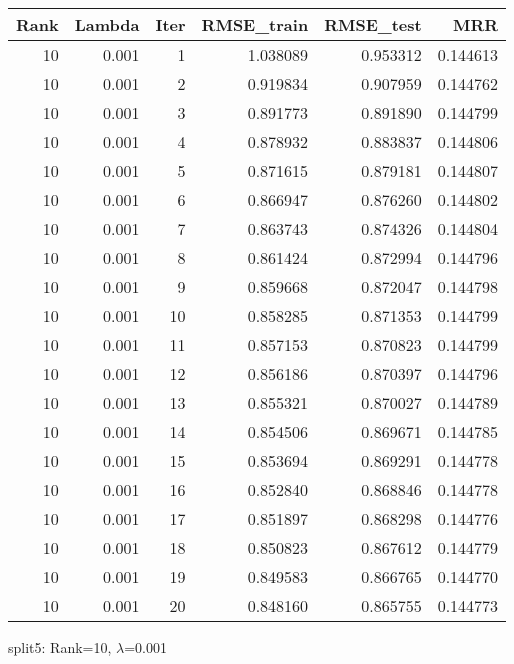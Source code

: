 \begin{tabular}{rrrrrr}
\toprule
 Rank &  Lambda &  Iter &  RMSE\_train &  RMSE\_test &       MRR \\
\midrule
   10 &   0.001 &     1 &    1.038089 &   0.953312 &  0.144613 \\
   10 &   0.001 &     2 &    0.919834 &   0.907959 &  0.144762 \\
   10 &   0.001 &     3 &    0.891773 &   0.891890 &  0.144799 \\
   10 &   0.001 &     4 &    0.878932 &   0.883837 &  0.144806 \\
   10 &   0.001 &     5 &    0.871615 &   0.879181 &  0.144807 \\
   10 &   0.001 &     6 &    0.866947 &   0.876260 &  0.144802 \\
   10 &   0.001 &     7 &    0.863743 &   0.874326 &  0.144804 \\
   10 &   0.001 &     8 &    0.861424 &   0.872994 &  0.144796 \\
   10 &   0.001 &     9 &    0.859668 &   0.872047 &  0.144798 \\
   10 &   0.001 &    10 &    0.858285 &   0.871353 &  0.144799 \\
   10 &   0.001 &    11 &    0.857153 &   0.870823 &  0.144799 \\
   10 &   0.001 &    12 &    0.856186 &   0.870397 &  0.144796 \\
   10 &   0.001 &    13 &    0.855321 &   0.870027 &  0.144789 \\
   10 &   0.001 &    14 &    0.854506 &   0.869671 &  0.144785 \\
   10 &   0.001 &    15 &    0.853694 &   0.869291 &  0.144778 \\
   10 &   0.001 &    16 &    0.852840 &   0.868846 &  0.144778 \\
   10 &   0.001 &    17 &    0.851897 &   0.868298 &  0.144776 \\
   10 &   0.001 &    18 &    0.850823 &   0.867612 &  0.144779 \\
   10 &   0.001 &    19 &    0.849583 &   0.866765 &  0.144770 \\
   10 &   0.001 &    20 &    0.848160 &   0.865755 &  0.144773 \\
\bottomrule
\end{tabular}

\caption{split5: Rank=10, $\lambda$=0.001}
